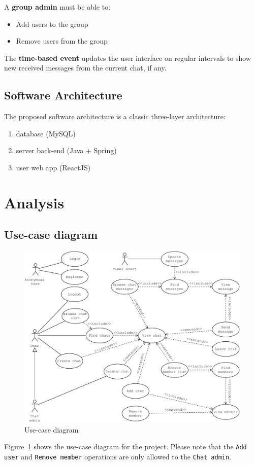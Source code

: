 \documentclass[10pt]{article}
\begin{document}
A \textbf{group admin} must be able to:
\begin{itemize}
    \item Add users to the group
    \item Remove users from the group
\end{itemize}

The \textbf{time-based event} updates the user interface on regular intervals
to show new received messages from the current chat, if any.

\subsection{Software Architecture}
The proposed software architecture is a classic three-layer architecture:
\begin{enumerate}
    \item database (MySQL)
    \item server back-end (Java + Spring)
    \item user web app (ReactJS)
\end{enumerate}

\clearpage
\section{Analysis}
\subsection{Use-case diagram}
\begin{figure}[h!]
    \centering
    \includegraphics[width=\textwidth]{figs/use_case_diagram}
    \caption{Use-case diagram}
    \label{fig:usecase}
\end{figure}
Figure~\ref{fig:usecase} shows the use-case diagram for the project. Please note 
that the \texttt{Add user} and \texttt{Remove member} 
operations are only allowed to the \texttt{Chat admin}.
\end{document}
